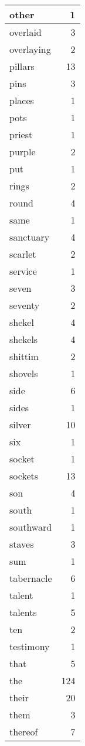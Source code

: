\begin{center}
\begin{longtable}{l|r}
other & 1 \\ \hline
overlaid & 3 \\ \hline
overlaying & 2 \\ \hline
pillars & 13 \\ \hline
pins & 3 \\ \hline
places & 1 \\ \hline
pots & 1 \\ \hline
priest & 1 \\ \hline
purple & 2 \\ \hline
put & 1 \\ \hline
rings & 2 \\ \hline
round & 4 \\ \hline
same & 1 \\ \hline
sanctuary & 4 \\ \hline
scarlet & 2 \\ \hline
service & 1 \\ \hline
seven & 3 \\ \hline
seventy & 2 \\ \hline
shekel & 4 \\ \hline
shekels & 4 \\ \hline
shittim & 2 \\ \hline
shovels & 1 \\ \hline
side & 6 \\ \hline
sides & 1 \\ \hline
silver & 10 \\ \hline
six & 1 \\ \hline
socket & 1 \\ \hline
sockets & 13 \\ \hline
son & 4 \\ \hline
south & 1 \\ \hline
southward & 1 \\ \hline
staves & 3 \\ \hline
sum & 1 \\ \hline
tabernacle & 6 \\ \hline
talent & 1 \\ \hline
talents & 5 \\ \hline
ten & 2 \\ \hline
testimony & 1 \\ \hline
that & 5 \\ \hline
the & 124 \\ \hline
their & 20 \\ \hline
them & 3 \\ \hline
thereof & 7 \\ \hline

\end{longtable}
\end{center}
